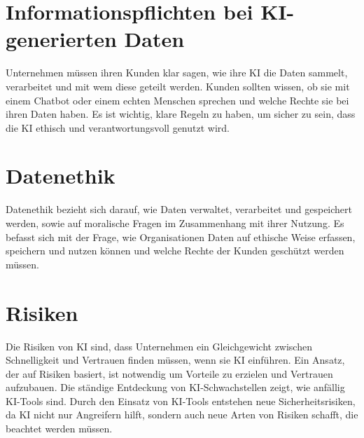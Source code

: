 \section{Informationspflichten bei KI-generierten Daten}
Unternehmen müssen ihren Kunden klar sagen, wie ihre KI die Daten sammelt, verarbeitet und mit wem diese geteilt werden. Kunden sollten wissen, ob sie mit einem Chatbot oder einem echten Menschen sprechen und welche Rechte sie bei ihren Daten haben. Es ist wichtig, klare  Regeln zu haben, um sicher zu sein, dass die KI ethisch und verantwortungsvoll genutzt wird.

\section{Datenethik}

Datenethik bezieht sich darauf, wie Daten verwaltet, verarbeitet und gespeichert werden, sowie auf moralische Fragen im Zusammenhang mit ihrer Nutzung. Es befasst sich mit der Frage, wie Organisationen Daten auf ethische Weise erfassen, speichern und nutzen können und welche Rechte der Kunden geschützt werden müssen.

\section{Risiken}
Die Risiken von KI sind, dass Unternehmen ein Gleichgewicht zwischen Schnelligkeit und Vertrauen finden müssen, wenn sie KI einführen. Ein Ansatz, der auf Risiken basiert, ist notwendig um Vorteile zu erzielen und Vertrauen aufzubauen. Die ständige Entdeckung von KI-Schwachstellen zeigt, wie anfällig KI-Tools sind. Durch den Einsatz von KI-Tools entstehen neue Sicherheitsrisiken, da KI nicht nur Angreifern hilft, sondern auch neue Arten von Risiken schafft, die beachtet werden müssen.